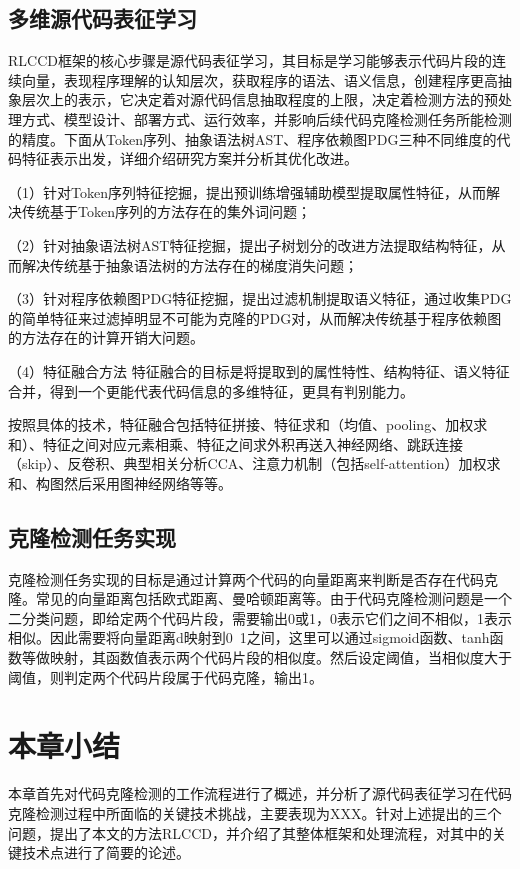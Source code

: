 \subsection{多维源代码表征学习}
RLCCD框架的核心步骤是源代码表征学习，其目标是学习能够表示代码片段的连续向量，表现程序理解的认知层次，获取程序的语法、语义信息，创建程序更高抽象层次上的表示，它决定着对源代码信息抽取程度的上限，决定着检测方法的预处理方式、模型设计、部署方式、运行效率，并影响后续代码克隆检测任务所能检测的精度。下面从Token序列、抽象语法树AST、程序依赖图PDG三种不同维度的代码特征表示出发，详细介绍研究方案并分析其优化改进。

（1）针对Token序列特征挖掘，提出预训练增强辅助模型提取属性特征，从而解决传统基于Token序列的方法存在的集外词问题；

（2）针对抽象语法树AST特征挖掘，提出子树划分的改进方法提取结构特征，从而解决传统基于抽象语法树的方法存在的梯度消失问题；

（3）针对程序依赖图PDG特征挖掘，提出过滤机制提取语义特征，通过收集PDG的简单特征来过滤掉明显不可能为克隆的PDG对，从而解决传统基于程序依赖图的方法存在的计算开销大问题。

（4）特征融合方法
特征融合的目标是将提取到的属性特性、结构特征、语义特征合并，得到一个更能代表代码信息的多维特征，更具有判别能力。

按照具体的技术，特征融合包括特征拼接、特征求和（均值、pooling、加权求和）、特征之间对应元素相乘、特征之间求外积再送入神经网络、跳跃连接（skip）、反卷积、典型相关分析CCA、注意力机制（包括self-attention）加权求和、构图然后采用图神经网络等等。
\subsection{克隆检测任务实现}
克隆检测任务实现的目标是通过计算两个代码的向量距离来判断是否存在代码克隆。常见的向量距离包括欧式距离、曼哈顿距离等。由于代码克隆检测问题是一个二分类问题，即给定两个代码片段，需要输出0或1，0表示它们之间不相似，1表示相似。因此需要将向量距离d映射到0~1之间，这里可以通过sigmoid函数、tanh函数等做映射，其函数值表示两个代码片段的相似度。然后设定阈值，当相似度大于阈值，则判定两个代码片段属于代码克隆，输出1。

\section{本章小结}
本章首先对代码克隆检测的工作流程进行了概述，并分析了源代码表征学习在代码克隆检测过程中所面临的关键技术挑战，主要表现为XXX。针对上述提出的三个问题，提出了本文的方法RLCCD，并介绍了其整体框架和处理流程，对其中的关键技术点进行了简要的论述。



